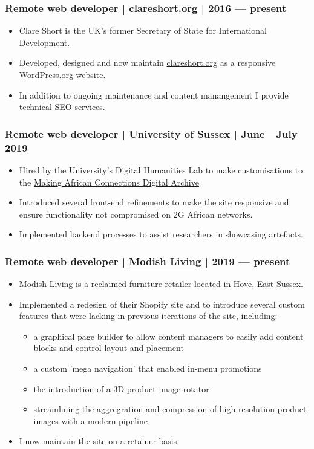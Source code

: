 \documentclass[11pt,a4paper]{article}
\begin{document}
\subsubsection*{Remote web developer | \href{https://www.clareshort.org}{clareshort.org} | 2016 --- present }
\begin{itemize}
    \item Clare Short is the UK's former Secretary of State for International Development.
    \item Developed, designed and now maintain \href{https://www.clareshort.org}{clareshort.org} as a responsive WordPress.org website.
    \item In addition to ongoing maintenance and content manangement I provide technical SEO services.
\end{itemize}

\subsubsection*{Remote web developer | University of Sussex | June---July 2019  }
\begin{itemize}
    \item Hired by the University's Digital Humanities Lab to make customisations to the \href{http://makingafricanconnections.org/s/archive/page/index}{Making African Connections Digital Archive}
    \item Introduced several front-end refinements to make the site responsive and ensure functionality not compromised on 2G African networks.
    \item Implemented backend processes to assist researchers in showcasing artefacts.
\end{itemize}

\subsubsection*{Remote web developer | \href{https://www.clareshort.org}{Modish Living} | 2019 --- present }
\begin{itemize}
    \item Modish Living is a reclaimed furniture retailer located in Hove, East Sussex. 
    \item Implemented a redesign of their Shopify site and to introduce several custom features that were lacking in previous iterations of the site, including:
        \begin{itemize}
            \item a graphical page builder to allow content managers to easily add content blocks and control layout and placement
            \item a custom 'mega navigation' that enabled in-menu promotions
            \item the introduction of a 3D product image rotator
            \item streamlining the aggregration and compression of high-resolution product-images with a modern pipeline
        \end{itemize}
    \item I now maintain the site on a retainer basis   
\end{itemize}
\end{document}
